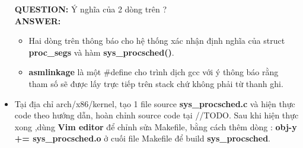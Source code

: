 \documentclass[a4paper]{article}
\begin{document}
\begin{itemize}
\textbf{QUESTION:} Ý nghĩa của 2 dòng trên ?\\
\textbf{ANSWER:}
\begin{itemize}
    \item Hai dòng trên thông báo cho hệ thống xác nhận định nghĩa của {\color{blue} struct} \textbf{proc\_segs} và hàm \textbf{sys\_procsched()}.
    \item \textbf{asmlinkage} là một \#define cho trình dịch gcc với ý thông báo rằng tham số sẽ được lấy trực tiếp trên stack chứ không phải từ thanh ghi.
\end{itemize}
\item Tại địa chỉ arch/x86/kernel, tạo 1 file source \textbf{sys\_procsched.c} và hiện thực code theo hướng dẫn, hoàn chỉnh source code tại {\color{blue} //TODO}. Sau khi hiện thực xong ,dùng \textbf{Vim editor} để chỉnh sửa  Makefile, bằng cách thêm dòng : \textbf{obj-y += sys\_procsched.o} ở cuối file Makefile để build \textbf{sys\_procsched}.
\end{itemize}
 \newpage
\end{document}
